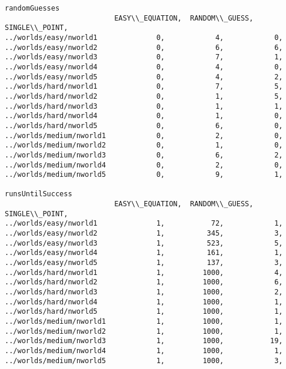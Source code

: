 \documentclass[british]{article}
\begin{document}
\begin{lstlisting}
randomGuesses
                          EASY\\_EQUATION,  RANDOM\\_GUESS,  SINGLE\\_POINT,
../worlds/easy/nworld1              0,            4,            0,
../worlds/easy/nworld2              0,            6,            6,
../worlds/easy/nworld3              0,            7,            1,
../worlds/easy/nworld4              0,            4,            0,
../worlds/easy/nworld5              0,            4,            2,
../worlds/hard/nworld1              0,            7,            5,
../worlds/hard/nworld2              0,            1,            5,
../worlds/hard/nworld3              0,            1,            1,
../worlds/hard/nworld4              0,            1,            0,
../worlds/hard/nworld5              0,            6,            0,
../worlds/medium/nworld1            0,            2,            0,
../worlds/medium/nworld2            0,            1,            0,
../worlds/medium/nworld3            0,            6,            2,
../worlds/medium/nworld4            0,            2,            0,
../worlds/medium/nworld5            0,            9,            1,

runsUntilSuccess
                          EASY\\_EQUATION,  RANDOM\\_GUESS,  SINGLE\\_POINT,
../worlds/easy/nworld1              1,           72,            1,
../worlds/easy/nworld2              1,          345,            3,
../worlds/easy/nworld3              1,          523,            5,
../worlds/easy/nworld4              1,          161,            1,
../worlds/easy/nworld5              1,          137,            3,
../worlds/hard/nworld1              1,         1000,            4,
../worlds/hard/nworld2              1,         1000,            6,
../worlds/hard/nworld3              1,         1000,            2,
../worlds/hard/nworld4              1,         1000,            1,
../worlds/hard/nworld5              1,         1000,            1,
../worlds/medium/nworld1            1,         1000,            1,
../worlds/medium/nworld2            1,         1000,            1,
../worlds/medium/nworld3            1,         1000,           19,
../worlds/medium/nworld4            1,         1000,            1,
../worlds/medium/nworld5            1,         1000,            3,


 \end{lstlisting}
 
\end{document}
